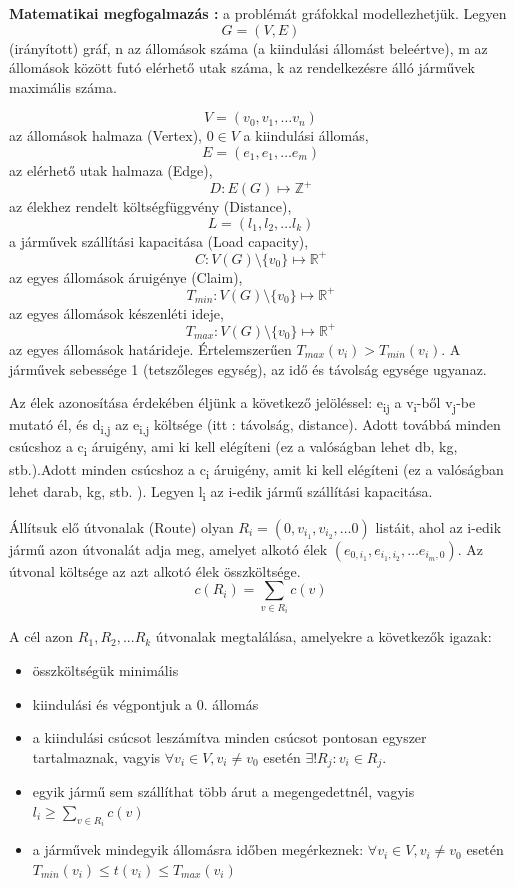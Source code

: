 \textbf{Matematikai megfogalmazás :} a problémát gráfokkal modellezhetjük.
\newline 
Legyen \[ G = (V,E) \] (irányított) gráf, n az állomások száma (a kiindulási állomást beleértve), m az állomások között futó elérhető utak száma, k az rendelkezésre álló járművek maximális száma.

\[ V = (v_0,v_1, \dots v_n )\] az állomások halmaza (Vertex), \(0 \in V\) a kiindulási állomás,
\[ E = (e_1,e_1, \dots e_m)\] az elérhető utak halmaza (Edge),
\[ D : E(G) \mapsto \mathbb{Z}^+\] az élekhez rendelt költségfüggvény (Distance),
\[ L = (l_1,l_2, \dots l_k)\] a járművek szállítási kapacitása (Load capacity),
\[ C : V(G)\setminus \{v_0\} \mapsto \mathbb{R}^+ \] az egyes állomások áruigénye (Claim),
\[ T_{min} :  V(G)\setminus \{v_0\} \mapsto \mathbb{R}^+ \] az egyes állomások készenléti ideje,
\[ T_{max} :  V(G)\setminus \{v_0\} \mapsto \mathbb{R}^+ \] az egyes állomások határideje. Értelemszerűen \(T_{max}(v_i) > T_{min}(v_i) \). A járművek sebessége 1 (tetszőleges egység), az idő és távolság egysége ugyanaz.

Az élek azonosítása érdekében éljünk a következő jelöléssel: e\textsubscript{ij} a v\textsubscript{i}-ből v\textsubscript{j}-be mutató él, és d\textsubscript{i,j} az e\textsubscript{i,j} költsége (itt : távolság, distance). Adott továbbá minden csúcshoz a c\textsubscript{i} áruigény, ami ki kell elégíteni (ez a valóságban lehet db, kg, stb.).Adott minden csúcshoz a c\textsubscript{i} áruigény, amit ki kell elégíteni (ez a valóságban lehet darab, kg, stb. ).  Legyen l\textsubscript{i} az i-edik jármű szállítási kapacitása.

Állítsuk elő útvonalak (Route) olyan \( R_{i} = (0, v_{i_1}, v_{i_2}, \dots 0) \) listáit,
ahol az i-edik jármű azon útvonalát adja meg, amelyet alkotó élek 
\( (e_{0,i_{1}}, e_{i_{1},i_{2}}, \dots e_{i_{m},0}) \). Az útvonal költsége az azt alkotó élek összköltsége. 
\begin{equation}
	c(R_i) = \sum_{v \in R_i} c(v)
\end{equation}


A cél azon \(R_1,R_2,...R_k \) útvonalak megtalálása, amelyekre a következők igazak:
\begin{itemize}
	\item összköltségük minimális
	\item kiindulási és végpontjuk a 0. állomás
	\item a kiindulási csúcsot leszámítva minden csúcsot pontosan egyszer tartalmaznak, vagyis \(\forall v_i \in V, v_i\ne v_0\) esetén \( \exists!R_j : v_i \in R_j \). 
	\item egyik jármű sem szállíthat több árut a megengedettnél, vagyis \(l_i \geqslant \sum_{v \in R_i} c(v) \)
	\item a járművek mindegyik állomásra időben megérkeznek: \(\forall v_i \in V, v_i\ne v_0\) esetén \( T_{min}(v_i) \leqslant t(v_i) \leqslant T_{max}(v_i) \)
\end{itemize}

